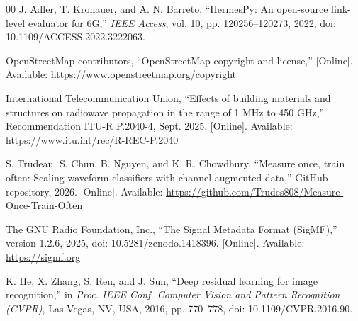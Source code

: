 \documentclass[10pt,conference,letterpaper]{IEEEtran}
\begin{document}
\begin{thebibliography}{00}
J. Adler, T. Kronauer, and A. N. Barreto, ``HermesPy: An open-source link-level evaluator for 6G,'' \emph{IEEE Access}, vol. 10, pp. 120256--120273, 2022, doi: 10.1109/ACCESS.2022.3222063.

OpenStreetMap contributors, ``OpenStreetMap copyright and license,'' [Online]. Available: \url{https://www.openstreetmap.org/copyright}

International Telecommunication Union, ``Effects of building materials and structures on radiowave propagation in the range of 1 MHz to 450 GHz,'' Recommendation ITU-R P.2040-4, Sept. 2025. [Online]. Available: \url{https://www.itu.int/rec/R-REC-P.2040}

S. Trudeau, S. Chun, B. Nguyen, and K. R. Chowdhury, ``Measure once, train often: Scaling waveform classifiers with channel-augmented data,'' GitHub repository, 2026. [Online]. Available: \url{https://github.com/Trudes808/Measure-Once-Train-Often}

The GNU Radio Foundation, Inc., ``The Signal Metadata Format (SigMF),'' version 1.2.6, 2025, doi: 10.5281/zenodo.1418396. [Online]. Available: \url{https://sigmf.org}

K. He, X. Zhang, S. Ren, and J. Sun, ``Deep residual learning for image recognition,'' in \emph{Proc. IEEE Conf. Computer Vision and Pattern Recognition (CVPR)}, Las Vegas, NV, USA, 2016, pp. 770--778, doi: 10.1109/CVPR.2016.90.

\end{thebibliography}
\end{document}
